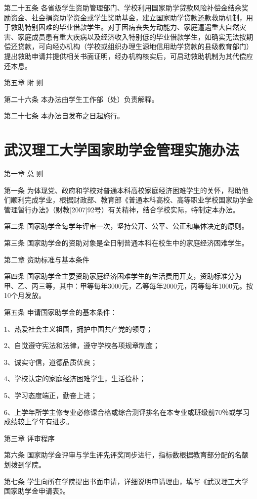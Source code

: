\documentclass[UTF8,12pt,a4paper]{report}
\begin{document}
第二十五条 各省级学生资助管理部门、学校利用国家助学贷款风险补偿金结余奖励资金、社会捐资助学资金或学生奖助基金，建立国家助学贷款还款救助机制，用于救助特别困难的毕业借款学生。对于因病丧失劳动能力、家庭遭遇重大自然灾害、家庭成员患有重大疾病以及经济收入特别低的毕业借款学生，如确实无法按期偿还贷款，可向经办机构（学校或组织办理生源地信用助学贷款的县级教育部门）提出救助申请并提供相关书面证明，经办机构核实后，可启动救助机制为其代偿应还本息。

第五章 附 则

第二十六条 本办法由学生工作部（处）负责解释。

第二十七条 本办法自发布之日起施行。

\chapter{武汉理工大学国家助学金管理实施办法}
第一章 总 则

第一条 为体现党、政府和学校对普通本科高校家庭经济困难学生的关怀，帮助他们顺利完成学业，根据财政部、教育部《普通本科高校、高等职业学校国家助学金管理暂行办法》（财教[2007]92号）有关精神，结合学校实际，特制定本办法。

第二条 国家助学金每学年评审一次，坚持公开、公平、公正和集体决定的原则。

第三条 国家助学金的资助对象是全日制普通本科在校生中的家庭经济困难学生。

第二章 资助标准与基本条件

第四条 国家助学金主要资助家庭经济困难学生的生活费用开支，资助标准分为甲、乙、丙三等，其中：甲等每年3000元，乙等每年2000元，丙等每年1000元。按10个月发放。

第五条 申请国家助学金的基本条件：

1、热爱社会主义祖国，拥护中国共产党的领导；

2、自觉遵守宪法和法律，遵守学校各项规章制度；

3、诚实守信，道德品质优良；

4、学校认定的家庭经济困难学生，生活俭朴；

5、学习态度端正，勤奋上进；

6、上学年所学主修专业必修课合格或综合测评排名在本专业或班级前70％或学习成绩较上学年有进步。

第三章 评审程序

第六条 国家助学金评审与学生评先评奖同步进行，指标数根据教育部分配的名额划拨到学院。

第七条 学生向所在学院提出书面申请，详细说明申请理由，填写《武汉理工大学国家助学金申请表》。
\end{document}
